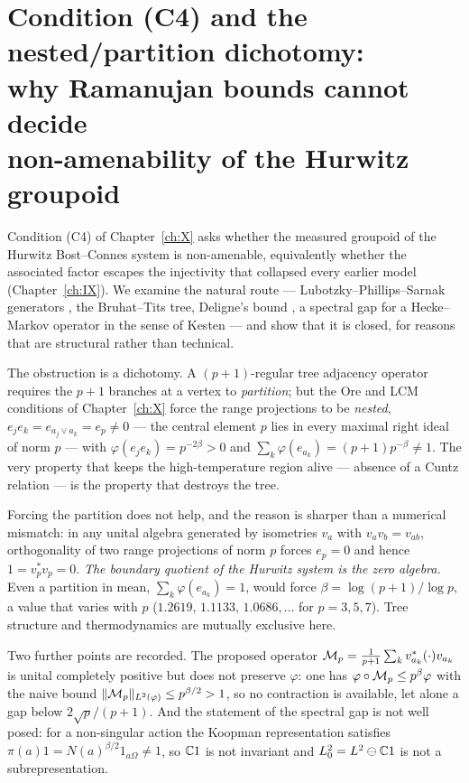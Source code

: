 \chapter[The Ramanujan route to (C4) is closed]{Condition \textup{(C4)} and the nested/partition dichotomy:\\ why Ramanujan bounds cannot decide\\ non-amenability of the Hurwitz groupoid}\label{ch:XI}
\renewcommand{\Nrd}{\operatorname{Nrd}}
\begin{summary}
Condition (C4) of Chapter~\ref{ch:X} asks whether the measured groupoid of the Hurwitz
Bost--Connes system is non-amenable, equivalently whether the associated factor escapes the
injectivity that collapsed every earlier model (Chapter~\ref{ch:IX}). We examine the natural route ---
Lubotzky--Phillips--Sarnak generators \cite{LPS}, the Bruhat--Tits tree, Deligne's bound
\cite{Deligne}, a spectral gap for a Hecke--Markov operator in the sense of Kesten
\cite{Kesten} --- and show that it is closed, for reasons that are structural rather than
technical.

The obstruction is a dichotomy. A $(p+1)$-regular tree adjacency operator requires the $p+1$
branches at a vertex to \emph{partition}; but the Ore and LCM conditions of Chapter~\ref{ch:X} force
the range projections to be \emph{nested}, $e_je_k=e_{a_j\vee a_k}=e_p\ne0$ --- the central
element $p$ lies in every maximal right ideal of norm $p$ --- with $\varphi(e_je_k)=p^{-2\beta}>0$
and $\sum_k\varphi(e_{a_k})=(p+1)p^{-\beta}\ne1$. The very property that keeps the
high-temperature region alive --- absence of a Cuntz relation --- is the property that
destroys the tree.

Forcing the partition does not help, and the reason is sharper than a numerical mismatch: in
any unital algebra generated by isometries $v_a$ with $v_av_b=v_{ab}$, orthogonality of two
range projections of norm $p$ forces $e_p=0$ and hence $1=v_p^*v_p=0$. \emph{The boundary
quotient of the Hurwitz system is the zero algebra.} Even a partition in mean,
$\sum_k\varphi(e_{a_k})=1$, would force $\beta=\log(p+1)/\log p$, a value that varies with $p$
($1.2619,\,1.1133,\,1.0686,\dots$ for $p=3,5,7$). Tree structure and thermodynamics are
mutually exclusive here.

Two further points are recorded. The proposed operator
$\mathcal{M}_p=\frac{1}{p+1}\sum_kv_{a_k}^*(\cdot)v_{a_k}$ is unital completely positive but does not
preserve $\varphi$: one has $\varphi\circ\mathcal{M}_p\le p^{\beta}\varphi$ with the naive bound
$\|\mathcal{M}_p\|_{L^2(\varphi)}\le p^{\beta/2}>1$, so no contraction is available, let alone a gap
below $2\sqrt p/(p+1)$. And the statement of the spectral gap is not well posed: for a
non-singular action the Koopman representation satisfies $\pi(a)1=N(a)^{\beta/2}1_{a\Omega}\ne1$,
so $\mathbb{C}1$ is not invariant and $L^2_0=L^2\ominus\mathbb{C}1$ is not a subrepresentation.


\end{summary}
